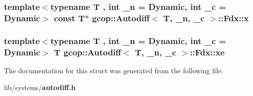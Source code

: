 \subsubsection[{x}]{\setlength{\rightskip}{0pt plus 5cm}template$<$typename T , int \-\_\-n = \-Dynamic, int \-\_\-c = \-Dynamic$>$ const \-T$\ast$ {\bf gcop\-::\-Autodiff}$<$ \-T, \-\_\-n, \-\_\-c $>$\-::{\bf \-Fdx\-::x}}\label{structgcop_1_1Autodiff_1_1Fdx_aab0f3b6070c578550d05531e5993ba91}
\subsubsection[{xe}]{\setlength{\rightskip}{0pt plus 5cm}template$<$typename T , int \-\_\-n = \-Dynamic, int \-\_\-c = \-Dynamic$>$ \-T {\bf gcop\-::\-Autodiff}$<$ \-T, \-\_\-n, \-\_\-c $>$\-::{\bf \-Fdx\-::xe}}\label{structgcop_1_1Autodiff_1_1Fdx_ad77beb7e27418f1cf726a104bb60ae5d}


\-The documentation for this struct was generated from the following file\-:\begin{DoxyCompactItemize}
\item 
lib/systems/{\bf autodiff.\-h}\end{DoxyCompactItemize}
